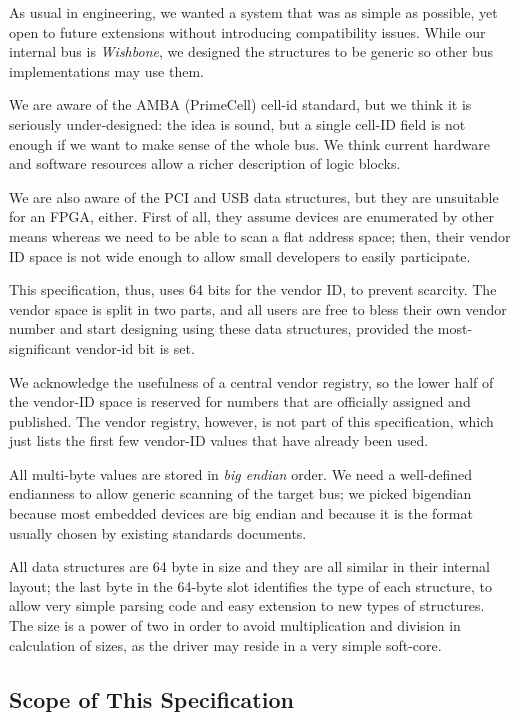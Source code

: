 \documentclass[a4paper, 12pt]{article}
\begin{document}
As usual in engineering, we wanted a system that was as simple as possible,
yet open to future extensions without introducing compatibility issues.
While our internal bus is \textit{Wishbone}, we designed the structures
to be generic so other bus implementations may use them. 

We are aware of the AMBA (PrimeCell) cell-id standard, but we think it
is seriously under-designed: the idea is sound, but a single cell-ID field
is not enough if we want to make sense of the whole bus. We think current
hardware and software resources allow a richer description of logic blocks.

We are also aware of the PCI and USB data structures, but they are
unsuitable for an FPGA, either. First of all, they assume devices are
enumerated by other means whereas we need to be able to scan a flat
address space; then, their vendor ID space is not wide enough to allow
small developers to easily participate.

This specification, thus, uses 64 bits for the vendor ID, to prevent scarcity.
The vendor space is split in two parts, and all users are free to bless their
own vendor number and start designing using these data structures,
provided the most-significant vendor-id bit is set.

We acknowledge the usefulness of a central vendor registry, so
the lower half of the
vendor-ID space is reserved for numbers that
are officially assigned and published.  The vendor registry, however, is not
part of this specification, which just lists the first few vendor-ID values that
have already been used.

All multi-byte values are stored in \textit{big endian} order.  We need
a well-defined endianness to allow generic scanning of the target bus;
we picked bigendian because most embedded devices are big endian and
because  it is the format usually chosen by existing standards documents.

All data structures are 64 byte in size and they are all similar in their
internal layout; the last byte in the 64-byte slot identifies the type
of each structure, to allow very simple parsing code and easy extension
to new types of structures.  The size is a power of two in order to
avoid multiplication and division in calculation of sizes, as the
driver may reside in a very simple soft-core.


\subsection{Scope of This Specification}
\end{document}

